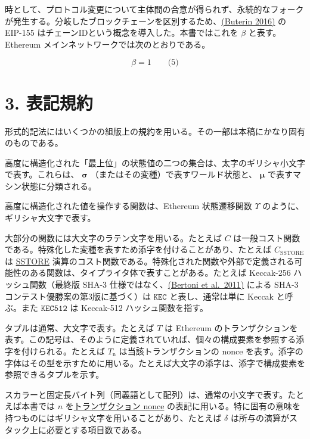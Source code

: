 \documentclass[
]{ltjsarticle}
\begin{document}
時として、プロトコル変更について主体間の合意が得られず、永続的なフォークが発生する。分岐したブロックチェーンを区別するため、\protect\hyperlink{ref-EIP-155}{(Buterin
2016)} の EIP-155 はチェーンIDという概念を導入した。本書ではこれを
\(\beta\) と表す。Ethereum メインネットワークでは次のとおりである。

\protect\hypertarget{chain_id}{}{}

\protect\hypertarget{eq-5}{}{}

\[\beta = 1 \qquad \text{(5)}\]

\protect\hypertarget{ch:conventions}{}{}

\hypertarget{ux8868ux8a18ux898fux7d04}{%
\section{3. 表記規約}\label{ux8868ux8a18ux898fux7d04}}

形式的記法にはいくつかの組版上の規約を用いる。その一部は本稿にかなり固有のものである。

高度に構造化された「最上位」の状態値の二つの集合は、太字のギリシャ小文字で表す。これらは、
\(\boldsymbol{\sigma}\) （またはその変種）で表すワールド状態と、
\(\boldsymbol{\mu}\) で表すマシン状態に分類される。

高度に構造化された値を操作する関数は、Ethereum 状態遷移関数
\protect\hyperlink{Upsilon_state_transition}{\(\Upsilon\)}
のように、ギリシャ大文字で表す。

大部分の関数には大文字のラテン文字を用いる。たとえば \(C\)
は一般コスト関数である。特殊化した変種を表すため添字を付けることがあり、たとえば
\protect\hyperlink{C__SSTORE}{\(C_\text{SSTORE}\)} は
\protect\hyperlink{SSTORE}{SSTORE}
演算のコスト関数である。特殊化された関数や外部で定義される可能性のある関数は、タイプライタ体で表すことがある。たとえば
Keccak-256 ハッシュ関数（最終版 SHA-3
仕様ではなく、\protect\hyperlink{ref-Keccak}{(Bertoni et al.~2011)}
による SHA-3 コンテスト優勝案の第3版に基づく）は \(\texttt{KEC}\)
と表し、通常は単に Keccak と呼ぶ。また \(\texttt{KEC512}\) は Keccak-512
ハッシュ関数を指す。

タプルは通常、大文字で表す。たとえば \(T\) は Ethereum
のトランザクションを表す。この記号は、そのように定義されていれば、個々の構成要素を参照する添字を付けられる。たとえば
\protect\hyperlink{transaction_nonce}{\(T_{\mathrm{n}}\)}
は当該トランザクションの nonce
を表す。添字の字体はその型を示すために用いる。たとえば大文字の添字は、添字で構成要素を参照できるタプルを示す。

スカラーと固定長バイト列（同義語として配列）は、通常の小文字で表す。たとえば本書では
\(n\) を\protect\hyperlink{transaction_nonce}{トランザクション nonce}
の表記に用いる。特に固有の意味を持つものにはギリシャ文字を用いることがあり、たとえば
\(\delta\) は所与の演算がスタック上に必要とする項目数である。
\end{document}
